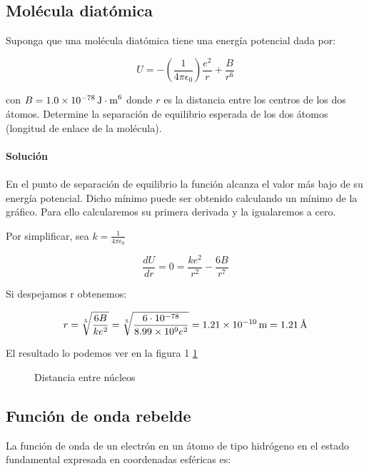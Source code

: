 \documentclass[12pt, a4paper]{article}
\begin{document}
    \subsection{Molécula diatómica}
    Suponga que una molécula diatómica tiene una energía potencial dada por:

    $$U=-\left(\frac{1}{4\pi\epsilon_0}\right)\frac{e^2}{r}+\frac{B}{r^6}$$

    con $B=\SI{1.0d-78}{\J\cdot\meter^6}$ donde $r$ es la distancia entre los centros de los dos átomos.
    Determine la separación de equilibrio esperada de los dos átomos (longitud de enlace de la molécula).

    \paragraph{\textbf{Solución}}
    \paragraph{} En el punto de separación de equilibrio la función alcanza el valor más bajo de su energía
    potencial. Dicho mínimo puede ser obtenido calculando un mínimo de la gráfico. Para ello
    calcularemos su primera derivada y la igualaremos a cero.

    Por simplificar, sea $k = \frac{1}{4\pi \epsilon_0}$

    $$\frac{dU}{dr} = 0 = \frac{k e^2}{r^2}-\frac{6 B}{r^7}$$

    Si despejamos r obtenemos:

    $$r = \sqrt[5]{\frac{6B}{k e^2}} = \sqrt[5]{\frac{6\cdot 10^{-78}}{\num{8.99d9} e^2}} = \SI{1.21d-10}{m} = \SI{1.21}{\angstrom}$$

    El resultado lo podemos ver en la figura 1 \ref{gr:molecula_diatomica}

    \begin{figure}[ht]
      \centering
      \caption{Distancia entre núcleos} \label{gr:molecula_diatomica}
        \fontsize{8}{12}\selectfont
        \resizebox{1\textwidth}{!}{}
    \end{figure}
    \FloatBarrier   %

    \subsection{Función de onda rebelde}
    La función de onda de un electrón en un átomo de tipo hidrógeno en el estado fundamental
    expresada en coordenadas esféricas es:
\end{document}
